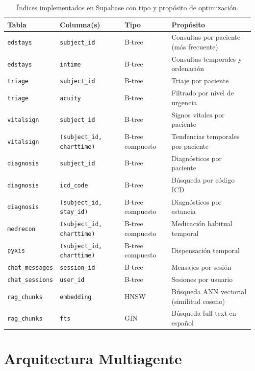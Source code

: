 ﻿\documentclass[11pt,a4paper]{article}
\begin{document}
\begin{table}[H]
\centering
\caption{\'Indices implementados en Supabase con tipo y prop\'osito de optimizaci\'on.}
\label{tab:indices}
\begin{tabularx}{\textwidth}{lllX}
\toprule
\textbf{Tabla} & \textbf{Columna(s)} & \textbf{Tipo} & \textbf{Prop\'osito} \\
\midrule
\texttt{edstays} & \texttt{subject\_id} & B-tree & Consultas por paciente (m\'as frecuente) \\
\texttt{edstays} & \texttt{intime} & B-tree & Consultas temporales y ordenaci\'on \\
\texttt{triage} & \texttt{subject\_id} & B-tree & Triaje por paciente \\
\texttt{triage} & \texttt{acuity} & B-tree & Filtrado por nivel de urgencia \\
\texttt{vitalsign} & \texttt{subject\_id} & B-tree & Signos vitales por paciente \\
\texttt{vitalsign} & \texttt{(subject\_id, charttime)} & B-tree compuesto & Tendencias temporales por paciente \\
\texttt{diagnosis} & \texttt{subject\_id} & B-tree & Diagn\'osticos por paciente \\
\texttt{diagnosis} & \texttt{icd\_code} & B-tree & B\'usqueda por c\'odigo ICD \\
\texttt{diagnosis} & \texttt{(subject\_id, stay\_id)} & B-tree compuesto & Diagn\'osticos por estancia \\
\texttt{medrecon} & \texttt{(subject\_id, charttime)} & B-tree compuesto & Medicaci\'on habitual temporal \\
\texttt{pyxis} & \texttt{(subject\_id, charttime)} & B-tree compuesto & Dispensaci\'on temporal \\
\texttt{chat\_messages} & \texttt{session\_id} & B-tree & Mensajes por sesi\'on \\
\texttt{chat\_sessions} & \texttt{user\_id} & B-tree & Sesiones por usuario \\
\texttt{rag\_chunks} & \texttt{embedding} & HNSW & B\'usqueda ANN vectorial (similitud coseno) \\
\texttt{rag\_chunks} & \texttt{fts} & GIN & B\'usqueda full-text en espa\~nol \\
\bottomrule
\end{tabularx}
\end{table}

\section{Arquitectura Multiagente}
\end{document}
